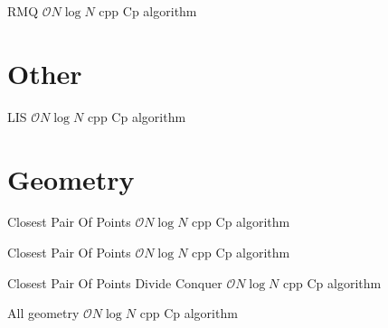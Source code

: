 {RMQ}
{$\mathcal{O}{N \log{N}}$}
{cpp}{}
{Cp algorithm}

\section{Other}

{LIS}
{$\mathcal{O}{N \log{N}}$}
{cpp}{}
{Cp algorithm}

\section{Geometry}

{Closest Pair Of Points}
{$\mathcal{O}{N \log{N}}$}
{cpp}{}
{Cp algorithm}

{Closest Pair Of Points}
{$\mathcal{O}{N \log{N}}$}
{cpp}{}
{Cp algorithm}

{Closest Pair Of Points Divide Conquer}
{$\mathcal{O}{N \log{N}}$}
{cpp}{}
{Cp algorithm}

{All geometry}
{$\mathcal{O}{N \log{N}}$}
{cpp}{}
{Cp algorithm}